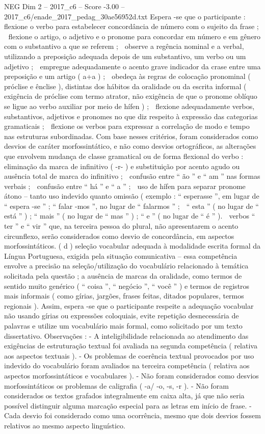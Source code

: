 \begin{textsample}{NEG Dim 2 – 2017\_c6 – Score -3.00 – 2017\_c6/enade\_2017\_pedag\_30ae56952d.txt}
Espera -se que o participante :  flexione o verbo para estabelecer concordância de número com o sujeito da frase ;  flexione o artigo, o adjetivo e o pronome para concordar em número e em gênero com o substantivo a que se referem ;  observe a regência nominal e a verbal, utilizando a preposição adequada depois de um substantivo, um verbo ou um adjetivo ;  empregue adequadamente o acento grave indicador da crase entre uma preposição e um artigo ( a+a ) ;  obedeça às regras de colocação pronominal ( próclise e ênclise ), distintas dos hábitos da oralidade ou da escrita informal ( exigência de próclise com termo atrator, não exigência de que o pronome oblíquo se ligue ao verbo auxiliar por meio de hífen ) ;  flexione adequadamente verbos, substantivos, adjetivos e pronomes no que diz respeito à expressão das categorias gramaticais ;  flexione os verbos para expressar a correlação de modo e tempo nas estruturas subordinadas.
Com base nesses critérios, foram considerados como desvios de caráter morfossintático, e não como desvios ortográficos, as alterações que envolvem mudança de classe gramatical ou de forma flexional do verbo :  eliminação da marca de infinitivo ( -r- ) e substituição por acento agudo ou ausência total de marca do infinitivo ;  confusão entre “ ão ” e “ am ” nas formas verbais ;  confusão entre “ há ” e “ a ” ;  uso de hífen para separar pronome átono – tanto uso indevido quanto omissão ( exemplo : “ esperasse ”, em lugar de “ espera -se ” ; “ falar -mos ”, no lugar de “ falarmos ” ;  “ esta ” ( no lugar de “ está ” ) ; “ mais ” ( no lugar de “ mas ” ) ; “ e ” ( no lugar de “ é ” ).  verbos “ ter ” e “ vir ” que, na terceira pessoa do plural, não apresentarem o acento circunflexo, serão considerados como desvio de concordância, em aspectos morfossintáticos. ( d ) seleção vocabular adequada à modalidade escrita formal da Língua Portuguesa, exigida pela situação comunicativa – essa competência envolve a precisão na seleção/utilização do vocabulário relacionado à temática solicitada pela questão ; a ausência de marcas da oralidade, como termos de sentido muito genérico ( “ coisa ”, “ negócio ”, “ você ” ) e termos de registros mais informais ( como gírias, jargões, frases feitas, ditados populares, termos regionais ).
Assim, espera -se que o participante respeite a adequação vocabular não usando gírias ou expressões coloquiais, evite repetição desnecessária de palavras e utilize um vocabulário mais formal, como solicitado por um texto dissertativo.
Observações : - A inteligibilidade relacionada ao atendimento das exigências de estruturação textual foi avaliada na segunda competência ( relativa aos aspectos textuais ). - Os problemas de coerência textual provocados por uso indevido do vocabulário foram avaliados na terceira competência ( relativa aos aspectos morfossintáticos e vocabulares ). - Não foram considerados como desvios morfossintáticos os problemas de caligrafia ( -a/ -o, -s, -r ). - Não foram considerados os textos grafados integralmente em caixa alta, já que não seria possível distinguir alguma marcação especial para as letras em início de frase. - Cada desvio foi considerado como uma ocorrência, mesmo que dois desvios fossem relativos ao mesmo aspecto linguístico.

\end{textsample}
